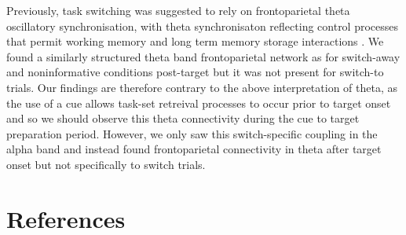 \documentclass[preprint,authoryear,11pt,5p,times,twocolumns]{elsarticle}
\begin{document}
Previously, task switching was suggested to rely on frontoparietal theta oscillatory synchronisation, with theta synchronisaton reflecting control processes that permit working memory and long term memory storage interactions \citep{SausengTSWT}. We found a similarly structured theta band frontoparietal network as \citeauthor{SausengTSWT} for switch-away and noninformative conditions post-target but it was not present for switch-to trials. Our findings are therefore contrary to the above interpretation of theta, as the use of a cue allows task-set retreival processes to occur prior to target onset and so we should observe this theta connectivity during the cue to target preparation period. However, we only saw this switch-specific coupling in the alpha band and instead found frontoparietal connectivity in theta after target onset but not specifically to switch trials. 
\newpage
\section{References}


\end{document}
